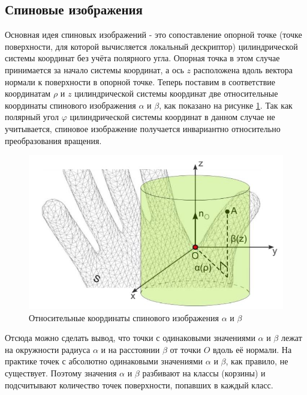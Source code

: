 \documentclass[14pt]{article}
\numberwithin{figure}{section}
\numberwithin{equation}{section}
\begin{document}
\subsection{Спиновые изображения}

Основная идея спиновых изображений \cite{JAESpin} - это сопоставление опорной точке (точке поверхности, для которой вычисляется локальный дескриптор) цилиндрической системы координат без учёта полярного угла. Опорная точка в этом случае принимается за начало системы координат, а ось $z$ расположена вдоль вектора нормали к поверхности в опорной точке. Теперь поставим в соответствие координатам $\rho$ и $z$ цилиндрической системы координат две относительные координаты спинового изображения $\alpha$ и $\beta$, как показано на рисунке \ref{ris:2}. Так как полярный угол $\varphi$ цилиндрической системы координат в данном случае не учитывается, спиновое изображение получается инвариантно относительно преобразования вращения.

\begin{figure}[h]
	\begin{center}
		\includegraphics[scale=0.9]{2.JPG}
		\caption{Относительные координаты спинового изображения $\alpha$ и $\beta$}
		\label{ris:2}
	\end{center}
\end{figure}

Отсюда можно сделать вывод, что точки с одинаковыми значениями $\alpha$ и $\beta$ лежат на окружности радиуса $\alpha$ и на расстоянии $\beta$ от точки $O$ вдоль её нормали. На практике точек с абсолютно одинаковыми значениями $\alpha$ и $\beta$, как правило, не существует. Поэтому значения $\alpha$ и $\beta$ разбивают на классы (корзины) и подсчитывают количество точек поверхности, попавших в каждый класс.
\end{document}
